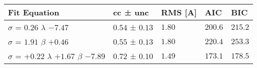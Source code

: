 \begin{tabular}{lllll}
\toprule
Fit Equation & cc ± unc & RMS [A] & AIC & BIC \\
\midrule
$\sigma$ = $0.26$ $\lambda$ $-7.47$ & $0.54$ ± $0.13$ & $1.80$ & $200.6$ & $215.2$ \\
$\sigma$ = $1.91$ $\beta$ $+0.46$ & $0.55$ ± $0.13$ & $1.80$ & $220.4$ & $253.3$ \\
$\sigma$ = $+0.22$ $\lambda$ $+1.67$ $\beta$ $-7.89$ & $0.72$ ± $0.10$ & $1.49$ & $173.1$ & $178.5$ \\
\bottomrule
\end{tabular}
